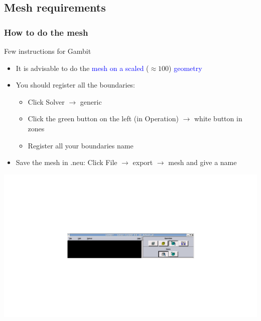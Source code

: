 \documentclass[compress,10pt]{beamer}
\begin{document}
 \subsection{Mesh requirements}
 \begin{frame}
  \frametitle{How to do the mesh}
 \begin{block}{Few instructions for Gambit}
 \begin{itemize}
  \item It is advisable to do the \textcolor{blue}{mesh on a scaled} ($\approx 100$) \textcolor{blue}{geometry} 
  \item You should register all the boundaries:
 \begin{itemize} 
 \item Click Solver $\rightarrow$ generic
 \item Click the green button on the left (in Operation) $\rightarrow$ white button in zones 
 \item Register all your boundaries name
 \end{itemize}
 \item Save the mesh in .neu:
       Click File $\rightarrow$ export $\rightarrow$ mesh  and give a name
 \end{itemize}
 \end{block}
\includegraphics[width=1.2\textwidth,viewport= 200 250 1200 500,clip]{gambit1.png}
 \end{frame}
\end{document}
